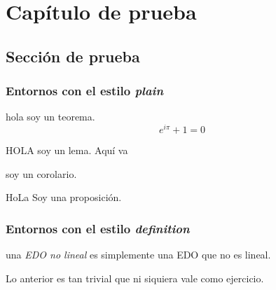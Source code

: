 \chapter{Capítulo de prueba}

\section{Sección de prueba}


\subsection{Entornos con el estilo \textit{plain}}

\begin{theorem}
hola soy un teorema.
\begin{equation}
    e^{i\pi} + 1 = 0
\end{equation}
\end{theorem}

\begin{lemma}
HOLA soy un lema. Aquí va 
\end{lemma}

\begin{corollary}
soy un corolario.
\end{corollary}

\begin{proposition}
HoLa Soy una proposición.
\end{proposition}


\subsection{Entornos con el estilo \textit{definition}}

\begin{definition}
una \textit{EDO no lineal} es simplemente una EDO que no es lineal.
\end{definition}

\begin{exercise}[Ejercicio]
Lo anterior es tan trivial que ni siquiera vale como ejercicio.
\end{exercise}

